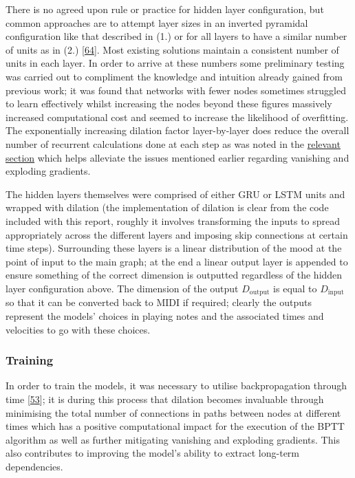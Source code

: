 \documentclass[12pt,]{article}
\begin{document}
There is no agreed upon rule or practice for hidden layer configuration,
but common approaches are to attempt layer sizes in an inverted
pyramidal configuration like that described in (1.) or for all layers to
have a similar number of units as in (2.)
{[}\protect\hyperlink{ref-doi10108001431160802549278}{64}{]}. Most
existing solutions maintain a consistent number of units in each layer.
In order to arrive at these numbers some preliminary testing was carried
out to compliment the knowledge and intuition already gained from
previous work; it was found that networks with fewer nodes sometimes
struggled to learn effectively whilst increasing the nodes beyond these
figures massively increased computational cost and seemed to increase
the likelihood of overfitting. The exponentially increasing dilation
factor layer-by-layer does reduce the overall number of recurrent
calculations done at each step as was noted in the
\protect\hyperlink{dilation}{relevant section} which helps alleviate the
issues mentioned earlier regarding vanishing and exploding gradients.

The hidden layers themselves were comprised of either GRU or LSTM units
and wrapped with dilation (the implementation of dilation is clear from
the code included with this report, roughly it involves transforming the
inputs to spread appropriately across the different layers and imposing
skip connections at certain time steps). Surrounding these layers is a
linear distribution of the mood at the point of input to the main graph;
at the end a linear output layer is appended to ensure something of the
correct dimension is outputted regardless of the hidden layer
configuration above. The dimension of the output \(D_{\text{output}}\)
is equal to \(D_{\text{input}}\) so that it can be converted back to
MIDI if required; clearly the outputs represent the models' choices in
playing notes and the associated times and velocities to go with these
choices.

\hypertarget{training}{%
\subsubsection{Training}\label{training}}

In order to train the models, it was necessary to utilise
backpropagation through time
{[}\protect\hyperlink{ref-werbos1990backpropagation}{53}{]}; it is
during this process that dilation becomes invaluable through minimising
the total number of connections in paths between nodes at different
times which has a positive computational impact for the execution of the
BPTT algorithm as well as further mitigating vanishing and exploding
gradients. This also contributes to improving the model's ability to
extract long-term dependencies.
\end{document}
